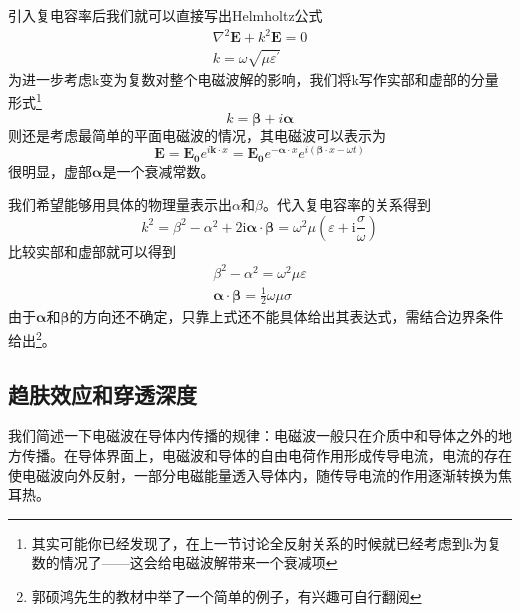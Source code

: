         引入复电容率后我们就可以直接写出Helmholtz公式
        \begin{equation}
            \begin{gathered}
                \nabla^2 \boldsymbol{E} + k^2 \boldsymbol{E} = 0 \\
                k = \omega \sqrt{\mu \varepsilon^\prime}
            \end{gathered}
        \end{equation}
        为进一步考虑k变为复数对整个电磁波解的影响，我们将k写作实部和虚部的分量形式\footnote{其实可能你已经发现了，在上一节讨论全反射关系的时候就已经考虑到k为复数的情况了——这会给电磁波解带来一个衰减项}
        \begin{equation}
            k = \boldsymbol{\beta}+ i \boldsymbol{\alpha}
        \end{equation}
        则还是考虑最简单的平面电磁波的情况，其电磁波可以表示为
        \begin{equation}
            \label{eq.4_49}
            \boldsymbol{E} = \boldsymbol{E_0}e^{i \boldsymbol{k}\cdot x} = \boldsymbol{E_0} e^{- \boldsymbol{\alpha} \cdot x} e^{i(\boldsymbol{\beta} \cdot x - \omega t)}
        \end{equation}
        很明显，虚部$\boldsymbol{\alpha}$是一个衰减常数。

        我们希望能够用具体的物理量表示出$\alpha$和$\beta$。代入复电容率的关系得到\[k^{2}=\beta^{2}-\alpha^{2}+2 \mathrm{i} \boldsymbol{\alpha} \cdot \boldsymbol{\beta}=\omega^{2} \mu\left(\varepsilon+\mathrm{i} \frac{\sigma}{\omega}\right)\]比较实部和虚部就可以得到
        \begin{equation}
            \label{eq.4_50}
            \begin{gathered}
                \beta^2 - \alpha^2 = \omega^2 \mu \varepsilon \\
                \boldsymbol{\alpha} \cdot \boldsymbol{\beta}= \frac{1}{2}\omega \mu \sigma
            \end{gathered}
        \end{equation}
        由于$\boldsymbol{\alpha}$和$\boldsymbol{\beta}$的方向还不确定，只靠上式还不能具体给出其表达式，需结合边界条件给出\footnote{郭硕鸿先生的教材中举了一个简单的例子，有兴趣可自行翻阅}。
    \subsection{趋肤效应和穿透深度}
        我们简述一下电磁波在导体内传播的规律：电磁波一般只在介质中和导体之外的地方传播。在导体界面上，电磁波和导体的自由电荷作用形成传导电流，电流的存在使电磁波向外反射，一部分电磁能量透入导体内，随传导电流的作用逐渐转换为焦耳热。


